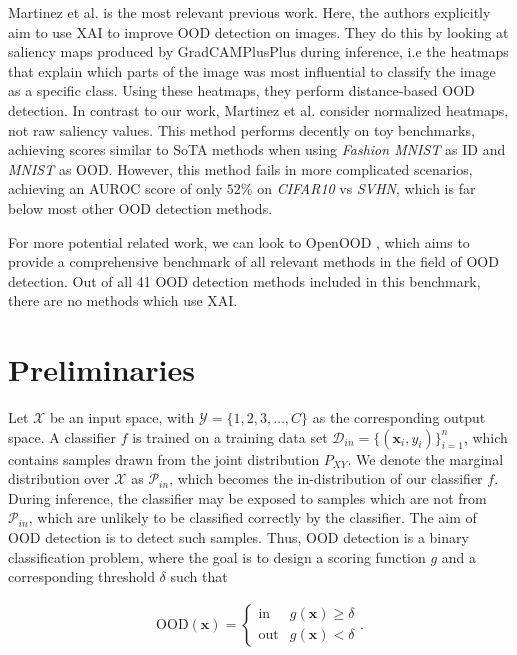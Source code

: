\documentclass[runningheads]{llncs}
\begin{document}
Martinez et al. \cite{martinez} is the most relevant previous work. Here, the authors explicitly aim to use XAI to improve OOD detection on images. They do this by looking at saliency maps produced by GradCAMPlusPlus \cite{gradcamplusplus} during inference, i.e the heatmaps that explain which parts of the image was most influential to classify the image as a specific class. Using these heatmaps, they perform distance-based OOD detection. In contrast to our work, Martinez et al. consider normalized heatmaps, not raw saliency values. This method performs decently on toy benchmarks, achieving scores similar to SoTA methods when using {\it Fashion MNIST} as ID and {\it MNIST} as OOD. However, this method fails in more complicated scenarios, achieving an AUROC score of only $52\%$ on {\it CIFAR10} vs {\it SVHN}, which is far below most other OOD detection methods. 

For more potential related work, we can look to OpenOOD \cite{openood, openood15}, which aims to provide a comprehensive benchmark of all relevant methods in the field of OOD detection. Out of all 41 OOD detection methods included in this benchmark, there are no methods which use XAI.

\section{Preliminaries}

Let $\mathcal{X}$ be an input space, with $\mathcal{Y} = \{1, 2, 3, \dots, C\}$ as the corresponding output space. A classifier $f$ is trained on a training data set $\mathcal{D}_{in} = \{(\bm{x}_i, y_i)\}^n_{i=1}$, which contains samples drawn from the joint distribution $P_{XY}$. We denote the marginal distribution over $\mathcal{X}$ as $\mathcal{P}_{in}$, which becomes the in-distribution of our classifier $f$. During inference, the classifier may be exposed to samples which are not from $\mathcal{P}_{in}$, which are unlikely to be classified correctly by the classifier. The aim of OOD detection is to detect such samples. Thus, OOD detection is a binary classification problem, where the goal is to design a scoring function $g$ and a corresponding threshold $\delta$ such that

\begin{align}
    \text{OOD}(\bm{x})=\begin{cases}
    \text{in } &  g(\bm{x}) \ge \delta \\
    \text{out} &  g(\bm{x}) < \delta
   \end{cases}.
\end{align}
\end{document}
